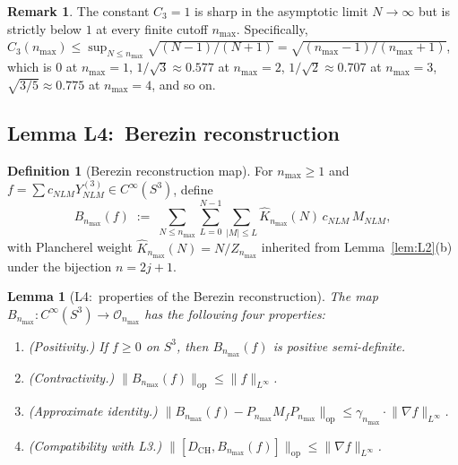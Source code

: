 \documentclass[11pt,a4paper]{article}
\theoremstyle{plain}
\newtheorem{lemma}[theorem]{Lemma}
\theoremstyle{definition}
\newtheorem{definition}[theorem]{Definition}
\newtheorem{remark}[theorem]{Remark}
\newcommand{\nmax}{n_{\max}}
\newcommand{\sthree}{S^{3}}
\newcommand{\Op}{\mathcal{O}}
\newcommand{\opnorm}[1]{\lVert #1 \rVert_{\mathrm{op}}}
\newcommand{\norm}[1]{\lVert #1 \rVert}
\newcommand{\Mat}{M}
\newcommand{\DCH}{D_{\mathrm{CH}}}
\begin{document}
\begin{remark}
The constant $C_3 = 1$ is sharp in the asymptotic limit
$N \to \infty$ but is strictly below $1$ at every finite cutoff
$\nmax$. Specifically,
$C_3(\nmax) \le \sup_{N \le \nmax} \sqrt{(N-1)/(N+1)}
= \sqrt{(\nmax - 1)/(\nmax + 1)}$, which is $0$ at $\nmax = 1$,
$1/\sqrt{3} \approx 0.577$ at $\nmax = 2$, $1/\sqrt{2} \approx 0.707$
at $\nmax = 3$, $\sqrt{3/5} \approx 0.775$ at $\nmax = 4$, and so on.
\end{remark}

\subsection{Lemma L4:\ Berezin reconstruction}
\label{sec:L4}

\begin{definition}[Berezin reconstruction map]\label{def:berezin}
For $\nmax \ge 1$ and
$f = \sum c_{NLM} Y^{(3)}_{NLM} \in C^\infty(\sthree)$, define
\begin{equation}\label{eq:B_def}
   B_{\nmax}(f)
   \;:=\; \sum_{N \le \nmax}\sum_{L=0}^{N-1}\sum_{|M| \le L}
   \widehat{K}_{\nmax}(N)\, c_{NLM}\, \Mat_{NLM},
\end{equation}
with Plancherel weight $\widehat{K}_{\nmax}(N) = N / Z_{\nmax}$ inherited
from Lemma~\ref{lem:L2}(b) under the bijection $n = 2j+1$.
\end{definition}

\begin{lemma}[L4:\ properties of the Berezin reconstruction]\label{lem:L4}
The map $B_{\nmax}: C^\infty(\sthree) \to \Op_{\nmax}$ has the
following four properties:
\begin{enumerate}\setlength{\itemsep}{2pt}
\item[(a)] (Positivity.) If $f \ge 0$ on $\sthree$, then $B_{\nmax}(f)$
is positive semi-definite.
\item[(b)] (Contractivity.) $\opnorm{B_{\nmax}(f)} \le \norm{f}_{L^\infty}$.
\item[(c)] (Approximate identity.)
$\opnorm{B_{\nmax}(f) - P_{\nmax} \Mat_f P_{\nmax}}
\le \gamma_{\nmax} \cdot \norm{\nabla f}_{L^\infty}$.
\item[(d)] (Compatibility with L3.)
$\opnorm{[\DCH, B_{\nmax}(f)]} \le \norm{\nabla f}_{L^\infty}$.
\end{enumerate}
\end{lemma}
\end{document}

